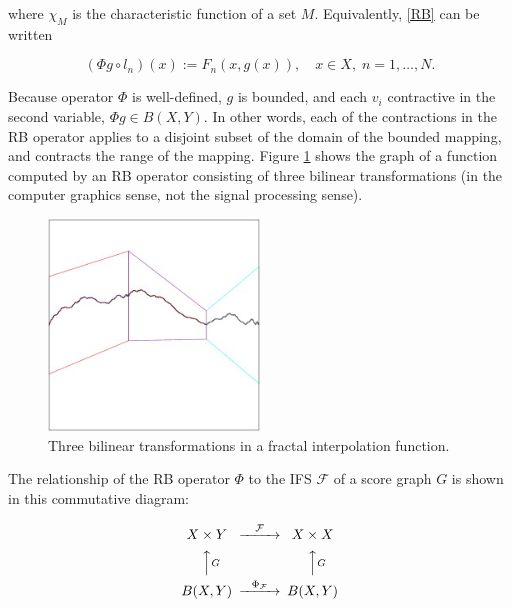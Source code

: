 \documentclass[english,11pt,letterpaper,onecolumn]{scrartcl}
\numberwithin{equation}{section}
\newcommand{\cF}{\mathcal{F}}
\newcommand{\be}{\begin{equation}}
\newcommand{\ee}{\end{equation}}
\begin{document}
\noindent where $\chi_M$ is the characteristic function of a set $M$.
Equivalently, \eqref{RB} can be written

\be\label{3.3}
(\Phi g \circ l_n) (x) := F_n (x, g(x)),\quad x\in X, \;n = 1, \ldots, N.
\ee

\noindent Because operator $\Phi$ is well-defined, $g$ is bounded, and each
$v_i$ contractive in the second variable, $\Phi g\in B(X,Y)$.  In other words,
each of the contractions in the RB operator applies to a disjoint subset of the
domain of the bounded mapping, and contracts the range of the mapping. Figure
\ref{fig:fif} shows the graph of a function computed by an RB operator
consisting of three bilinear transformations (in the computer graphics sense,
not the signal processing sense).

\begin{figure}
\centerline{\includegraphics[width = 0.5\textwidth]{interp}}
\caption{\label{fig:fif} Three bilinear transformations in
a fractal interpolation function.\protect\footnotemark}
\end{figure}


The relationship of the RB operator $\Phi$ to the IFS $\cF$ of a score graph
$G$ is shown in this commutative diagram:


\be\label{Phi}
\begin{CD}
X\times Y @>\cF>> X\times X\\
@AAGA                  @AAGA\\
B(X,Y) @>\Phi_\cF>>  B(X,Y)
\end{CD}
\ee
\end{document}

